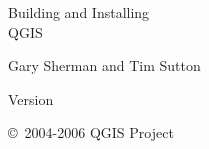\begin{titlepage}
\begin{center}
\huge{Building and Installing \\ QGIS~\CURRENT} 

\large{Gary Sherman and Tim Sutton}

\vspace{5cm}

\large{Version \SKRIPTVERSION}\\
\end{center}
\vspace{10cm}
\begin{flushleft}
\small{\copyright~2004-2006 QGIS Project \\}
\end{flushleft}
\end{titlepage}
